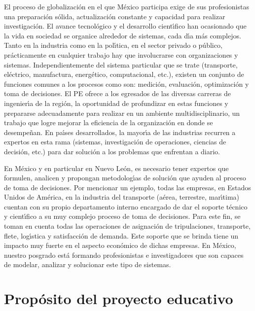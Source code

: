 \documentclass{article}
\begin{document}
El proceso de globalizaci\'{o}n en el que M\'{e}xico participa exige de sus
profesionistas una preparaci\'{o}n s\'{o}lida, actualizaci\'{o}n constante y
capacidad para realizar investigaci\'{o}n. El avance tecnol\'{o}gico y el
desarrollo cient\'{\i}fico han ocasionado que la vida en sociedad se
organice alrededor de sistemas, cada d\'{\i}a m\'{a}s complejos. Tanto en la
industria como en la pol\'{\i}tica, en el sector privado o p\'{u}blico,
pr\'{a}cticamente en cualquier trabajo hay que involucrarse con
organizaciones y sistemas. Independientemente del sistema particular
que se trate (transporte, el\'{e}ctrico, manufactura, energ\'{e}tico,
computacional, etc.), existen un conjunto de funciones comunes a los
procesos como son: medici\'{o}n, evaluaci\'{o}n, optimizaci\'{o}n y toma de
decisiones. El PE ofrece a los egresados de las diversas carreras de
ingenier\'{\i}a de la regi\'{o}n, la oportunidad de profundizar en estas
funciones y prepararse adecuadamente para realizar en un ambiente
multidisciplinario, un trabajo que logre mejorar la eficiencia de la
organizaci\'{o}n en donde se desempe\~{n}an.  En pa\'{\i}ses desarrollados, la
mayor\'{\i}a de las industrias recurren a expertos en esta rama (sistemas,
investigaci\'{o}n de operaciones, ciencias de decisi\'{o}n, etc.) para dar
soluci\'{o}n a los problemas que enfrentan a diario.

En M\'{e}xico y en
particular en Nuevo Le\'{o}n, es necesario tener expertos que formulen,
analicen y propongan metodolog\'{\i}as de soluci\'{o}n que ayuden al proceso de
toma de decisiones. Por mencionar un ejemplo, todas las empresas, en
Estados Unidos de Am\'{e}rica, en la industria del transporte (a\'{e}rea,
terrestre, mar\'{\i}tima) cuentan con su propio departamento interno
encargado de dar el soporte t\'{e}cnico y cient\'{\i}fico a su muy complejo
proceso de toma de decisiones. Para este fin, se toman en cuenta todas
las operaciones de asignaci\'{o}n de tripulaciones, transporte, flete,
log\'{\i}stica y satisfacci\'{o}n de demanda. Este soporte que se brinda tiene
un impacto muy fuerte en el aspecto econ\'{o}mico de dichas empresas. En
M\'{e}xico, nuestro posgrado est\'{a} formando profesionistas e investigadores
que son capaces de modelar, analizar y solucionar este tipo de
sistemas.

\section{Prop\'{o}sito del proyecto educativo}
\end{document}
